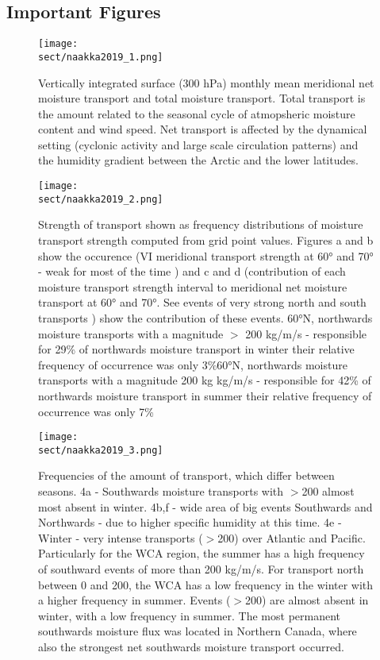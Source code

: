 \documentclass{article}
\begin{document}
\subsection*{Important Figures}
\begin{figure}[ht]
    \centering
    \vspace{-4mm}
    \texttt{[image: \\sect/naakka2019\_1.png]}
    \vspace{-4mm}
    \caption{Vertically integrated surface (300 hPa) monthly mean meridional net moisture transport and total moisture transport. Total transport is the amount related to the seasonal cycle of atmopsheric moisture content and wind speed. Net transport is affected by the dynamical setting (cyclonic activity and large scale circulation patterns) and the humidity gradient between the Arctic and the lower latitudes. }\label{f:naakka2019_1.png}
\end{figure}
\begin{figure}[ht]
    \centering
    \vspace{-4mm}
    \texttt{[image: \\sect/naakka2019\_2.png]}
    \vspace{-4mm}
    \caption{Strength of transport shown as frequency distributions of moisture transport strength computed from grid point values. Figures a and b show the occurence (VI meridional transport strength at 60° and 70° - weak for most of the time 
    ) and c and d (contribution of each moisture transport strength interval to meridional net moisture transport at 60° and 70°. See events of very strong north and south transports 
    ) show the contribution of these events. 60°N, northwards moisture transports with a magnitude $>$ 200 kg/m/s - responsible for 29\% of northwards moisture transport in winter their relative frequency of occurrence was only 3\%60°N, northwards moisture transports with a magnitude  200 kg kg/m/s - responsible for 42\% of northwards moisture transport in summer their relative frequency of occurrence was only 7\%}\label{f:naakka2019_2.png}
\end{figure}
\begin{figure}[ht]
    \centering
    \vspace{-4mm}
    \texttt{[image: \\sect/naakka2019\_3.png]}
    \vspace{-4mm}
    \caption{Frequencies of the amount of transport, which differ between seasons. 4a - Southwards moisture transports with $>$200 almost most absent in winter. 4b,f - wide area of big events Southwards and Northwards - due to higher specific humidity at this time. 4e - Winter - very intense transports ($>$200) over Atlantic and Pacific. Particularly for the WCA region, the summer has a high frequency of southward events of more than 200 kg/m/s. For transport north between 0 and 200, the WCA has a low frequency in the winter with a higher frequency in summer. Events ($>$200) are almost absent in winter, with a low frequency in summer. The most permanent southwards moisture flux was located in Northern Canada, where also the strongest net southwards moisture transport occurred.
     }\label{f:naakka2019_3.png}
\end{figure}
\end{document}

